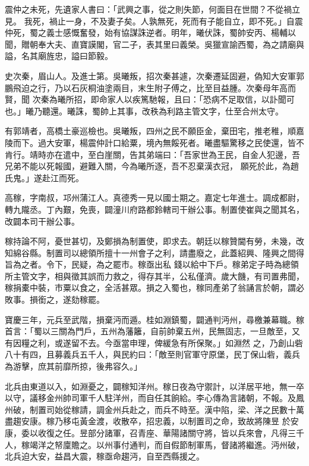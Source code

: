 \begin{pinyinscope}
 震仲之未死，先遺家人書曰：「武興之事，從之則失節，何面目在世間？不從禍立見。
 我死，禍止一身，不及妻子矣。人孰無死，死而有子能自立，即不死。」自震仲死，蜀之義士感慨奮發，始有協謀誅逆者。明年，曦伏誅，蜀帥安丙、楊輔以聞，贈朝奉大夫、直寶謨閣，官二子，表其里曰義榮。吳獵宣諭西蜀，為之請廟與謚，名其廟旌忠，謚曰節毅。



 史次秦，眉山人。及進士第。吳曦叛，招次秦甚遽，次秦遷延固避，偽知大安軍郭鵬飛迫之行，乃以石灰桐油塗兩目，末生附子傅之，比至目益腫。次秦母年高而賢，聞
 次秦為曦所招，即命家人以疾篤馳報，且曰：「恐病不足取信，以訃聞可也。」曦乃聽還。曦誅，蜀帥上其事，改秩為利路主管文字，仕至合州太守。



 有郭靖者，高橋土豪巡檢也。吳曦叛，四州之民不願臣金，棄田宅，推老稚，順嘉陵而下。過大安軍，楊震仲計口給粟，境內無餒死者。曦盡驅驚移之民使還，皆不肯行。靖時亦在遣中，至白崖關，告其弟端曰：「吾家世為王民，自金人犯邊，吾兄弟不能以死報國，避難入關，今為曦所逐，吾不忍棄漢衣冠，
 願死於此，為趙氏鬼。」遂赴江而死。



 高稼，字南叔，邛州蒲江人。真德秀一見以國士期之。嘉定七年進士。調成都尉，轉九隴丞。丁內艱，免喪，闢潼川府路都鈴轄司干辦公事。制置使崔與之聞其名，改闢本司干辦公事。



 稼持論不阿，憂世甚切，及鄭損為制置使，即求去。朝廷以稼贊閫有勞，未幾，改知綿谷縣。制置司以總領所擅十一州會子之利，請盡廢之，此蓋紹興、隆興之間得旨為之者。令下，民疑，為之罷市。稼亟出私
 錢以給中下戶。稼弟定子時為總領所主管文字，相與徵其誤而力救之，得存其半，公私僅濟。歲大饑，有司置弗聞，稼捐橐中裝，市粟以食之，全活甚眾。損之入蜀也，稼同產弟了翁誦言於朝，謂必敗事。損銜之，遂劾稼罷。



 寶慶三年，元兵至武階，損棄沔而遁。桂如淵鎮蜀，闢通判沔州，尋檄兼幕職。稼首言：「蜀以三關為門戶，五州為藩籬，自前帥棄五州，民無固志，一旦敵至，又有因糧之利，或遂留不去。今亟當申理，俾緩急有所保聚。」如淵然
 之，乃創山砦八十有四，且募義兵五千人，與民約曰：「敵至則官軍守原堡，民丁保山砦，義兵為游擊，庶其前靡所掠，後弗容久。」



 北兵由東道以入，如淵憂之，闢稼知洋州。稼日夜為守禦計，以洋居平地，無一卒以守，議移金州帥司軍千人駐洋州，而自任其餉給。李心傳為言諸朝，不報。及鳳州破，制置司始從稼請，調金州兵赴之，而兵不時至。漢中陷，梁、洋之民數十萬盡趨安康。稼乃移屯黃金渡，收散卒，招忠義，以制置司之命，致故將陳昱
 於安康，委以收復之任。昱部分諸軍，召青座、華陽諸關守將，皆以兵來會，凡得三千人，稼竭洋之帑廩贍之。以州事付通判，而自假節制軍馬，督諸將繼進。沔州破，北兵迫大安，益昌大震，稼亟命趨沔，自至西縣援之。




\end{pinyinscope}
